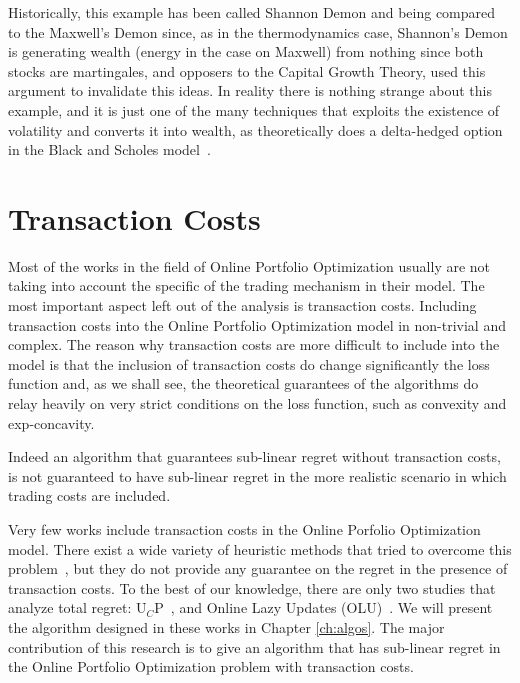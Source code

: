 Historically, this example has been called Shannon Demon \cite{poundstone2010fortune} and being compared to the Maxwell's Demon since, as in the thermodynamics case, Shannon's Demon is generating wealth (energy in the case on Maxwell) from nothing since both stocks are martingales, and opposers to the Capital Growth Theory, used this argument to invalidate this ideas. In reality there is nothing strange about this example, and it is just one of the many techniques that exploits the existence of volatility and converts it into wealth, as theoretically does a delta-hedged option in the Black and Scholes model~\cite{black1973pricing}.

\section{Transaction Costs}\label{sec:transaction_costs}

Most of the works in the field of Online Portfolio Optimization usually are not taking into account the specific of the trading mechanism in their model. The most important aspect left out of the analysis is transaction costs. Including transaction costs into the Online Portfolio Optimization model in non-trivial and complex. The reason why transaction costs are more difficult to include into the model is that the inclusion of transaction costs do change significantly the loss function and, as we shall see, the theoretical guarantees of the algorithms do relay heavily on very strict conditions on the loss function, such as convexity and exp-concavity.

Indeed an algorithm that guarantees sub-linear regret without transaction costs, is not guaranteed to have sub-linear regret in the more realistic scenario in which trading costs are included. 

Very few works include transaction costs in the Online Porfolio Optimization model. 
There exist a wide variety of heuristic methods that tried to overcome this problem~\cite{li2018transaction,yang2018reversion}, but they do not provide any guarantee on the regret in the presence of transaction costs. 
To the best of our knowledge, there are only two studies that analyze total regret: U$_C$P~\cite{blum1999universal}, and Online Lazy Updates (OLU)~\cite{das2013online}. We will present the algorithm designed in these works in Chapter \ref{ch:algos}. The major contribution of this research is to give an algorithm that has sub-linear regret in the Online Portfolio Optimization problem with transaction costs.


